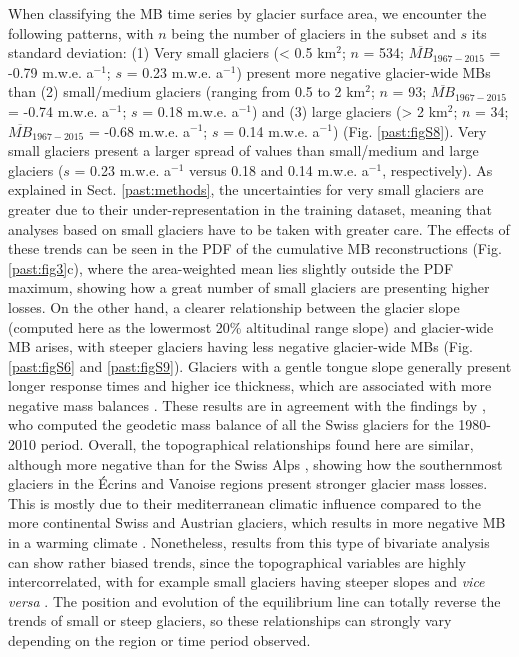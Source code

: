 {When classifying the MB time series by glacier surface area, we encounter the following patterns, with $n$ being the number of glaciers in the subset and $s$ its standard deviation: (1) Very small glaciers (< 0.5 km$^{2}$; $n$ = 534; $\overline{MB}_{1967-2015}$ = -0.79 m.w.e. a$^{-1}$; $s$ = 0.23 m.w.e. a$^{-1}$) present more negative glacier-wide MBs than (2) small/medium glaciers (ranging from 0.5 to 2 km$^{2}$; $n$ = 93; $\overline{MB}_{1967-2015}$ = -0.74 m.w.e. a$^{-1}$; $s$ = 0.18 m.w.e. a$^{-1}$) and (3) large glaciers (> 2 km$^{2}$; $n$ = 34; $\overline{MB}_{1967-2015}$ = -0.68 m.w.e. a$^{-1}$; $s$ = 0.14 m.w.e. a$^{-1}$) (Fig. \ref{past:figS8}). Very small glaciers present a larger spread of values than small/medium and large glaciers ($s$ = 0.23 m.w.e. a$^{-1}$ versus 0.18 and 0.14 m.w.e. a$^{-1}$, respectively). As explained in Sect. \ref{past:methods}, the uncertainties for very small glaciers are greater due to their under-representation in the training dataset, meaning that analyses based on small glaciers have to be taken with greater care. The effects of these trends can be seen in the PDF of the cumulative MB reconstructions (Fig. \ref{past:fig3}c), where the area-weighted mean lies slightly outside the PDF maximum, showing how a great number of small glaciers are presenting higher losses. On the other hand, a clearer relationship between the glacier slope (computed here as the lowermost 20\% altitudinal range slope) and glacier-wide MB arises, with steeper glaciers having less negative glacier-wide MBs (Fig. \ref{past:figS6} and \ref{past:figS9}). Glaciers with a gentle tongue slope generally present longer response times and higher ice thickness, which are associated with more negative mass balances \citep{hoelzle_secular_2003, huss_sensitivity_2016, zekollari_imbalance_2020}. These results are in agreement with the findings by \citet{fischer_surface_2015}, who computed the geodetic mass balance of all the Swiss glaciers for the 1980-2010 period. Overall, the topographical relationships found here are similar, although more negative than for the Swiss Alps \citep{huss_extrapolating_2012, huss_new_2015-2}, showing how the southernmost glaciers in the Écrins and Vanoise regions present stronger glacier mass losses. This is mostly due to their mediterranean climatic influence compared to the more continental Swiss and Austrian glaciers, which results in more negative MB in a warming climate \citep{oerlemans_relating_2000}. Nonetheless, results from this type of bivariate analysis can show rather biased trends, since the topographical variables are highly intercorrelated, with for example small glaciers having steeper slopes and \textit{vice versa} \citep{gardent_multitemporal_2014}. The position and evolution of the equilibrium line can totally reverse the trends of small or steep glaciers, so these relationships can strongly vary depending on the region or time period observed. 


}

